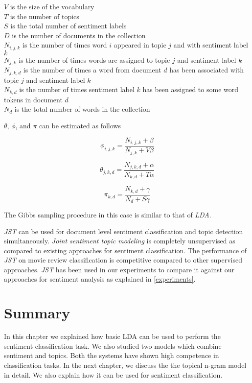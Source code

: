 \(V\) is the size of the vocabulary \\
\(T\) is the number of topics \\
\(S\) is the total number of sentiment labels \\
\(D\) is the number of documents in the collection \\
\(N_{i,j,k}\) is the number of times word \(i\) appeared in topic \(j\) and with sentiment label \(k\) \\
\(N_{j,k}\) is the number of times words are assigned to topic \(j\) and sentiment label \(k\) \\
\(N_{j,k,d}\) is the number of times a word from document \(d\) has been associated with topic \(j\) and sentiment label \(k\) \\
\(N_{k,d}\) is the number of times sentiment label \(k\) has been assigned to some word tokens in document \(d\) \\
\(N_{d}\) is the total number of words in the collection \\

\par

\(\theta\), \(\phi\), and \(\pi\) can be estimated as follows

\begin{equation}
\phi_{i,j,k} = \frac{N_{i,j,k}+\beta}{N_{j,k}+V\beta}
\end{equation}

\begin{equation}
\theta_{j,k,d} = \frac{N_{j,k,d}+\alpha}{N_{k,d}+T\alpha}
\end{equation}

\begin{equation}
\pi_{k,d} = \frac{N_{k,d}+\gamma}{N_{d}+S\gamma}
\end{equation}

The Gibbs sampling procedure in this case is similar to that of \textit{LDA}. 

\par
\textit{JST} can be used for document level sentiment classification and topic detection simultaneously. \textit{Joint sentiment topic modeling}
is completely unsupervised as compared to existing approaches for sentiment classification. The performance of \textit{JST} on movie review
classification is competitive compared to other supervised approaches. \textit{JST} has been used in our experiments to compare it against our
approaches for sentiment analysis as explained in \cref{experiments}.

\section*{Summary}
In this chapter we explained how basic LDA can be used to perform the sentiment classification task. We also studied two models which combine sentiment
and topics. Both the systems have shown high competence in classification tasks. In the next chapter, we discuss the the topical n-gram model in detail.
We also explain how it can be used for sentiment classification.

\clearpage
